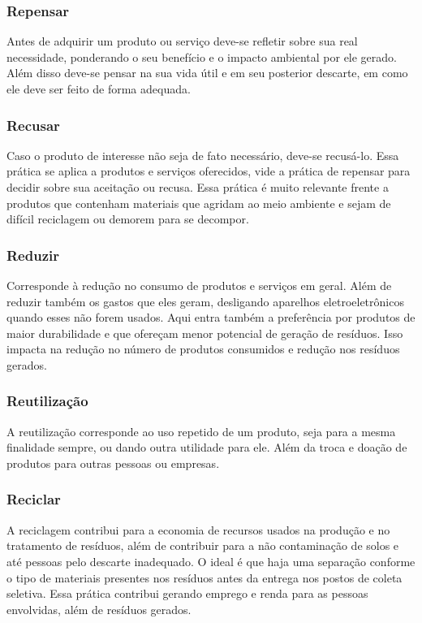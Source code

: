 \subsubsection{Repensar}
Antes de adquirir um produto ou serviço deve-se refletir sobre sua real necessidade, ponderando o seu benefício e o impacto ambiental por ele gerado. Além disso deve-se pensar na sua vida útil e em seu posterior descarte, em como ele deve ser feito de forma adequada.

\subsubsection{Recusar}
Caso o produto de interesse não seja de fato necessário, deve-se recusá-lo. Essa prática se aplica a produtos e serviços oferecidos, vide a prática de repensar para decidir sobre sua aceitação ou recusa. Essa prática é muito relevante frente a produtos que contenham materiais que agridam ao meio ambiente e sejam de difícil reciclagem ou demorem para se decompor.

\subsubsection{Reduzir}
Corresponde à redução no consumo de produtos e serviços em geral. Além de reduzir também os gastos que eles geram, desligando aparelhos eletroeletrônicos quando esses não forem usados. Aqui entra também a preferência por produtos de maior durabilidade e que ofereçam menor potencial de geração de resíduos. Isso impacta na redução no número de produtos consumidos e redução nos resíduos gerados.

\subsubsection{Reutilização}
A reutilização corresponde ao uso repetido de um produto, seja para a mesma finalidade sempre, ou dando outra utilidade para ele. Além da troca e doação de produtos para outras pessoas ou empresas.

\subsubsection{Reciclar}
A reciclagem contribui para a economia de recursos usados na produção e no tratamento de resíduos, além de contribuir para a não contaminação de solos e até pessoas pelo descarte inadequado. O ideal é que haja uma separação conforme o tipo de materiais presentes nos resíduos antes da entrega nos postos de coleta seletiva. Essa prática contribui gerando emprego e renda para as pessoas envolvidas, além de resíduos gerados.


